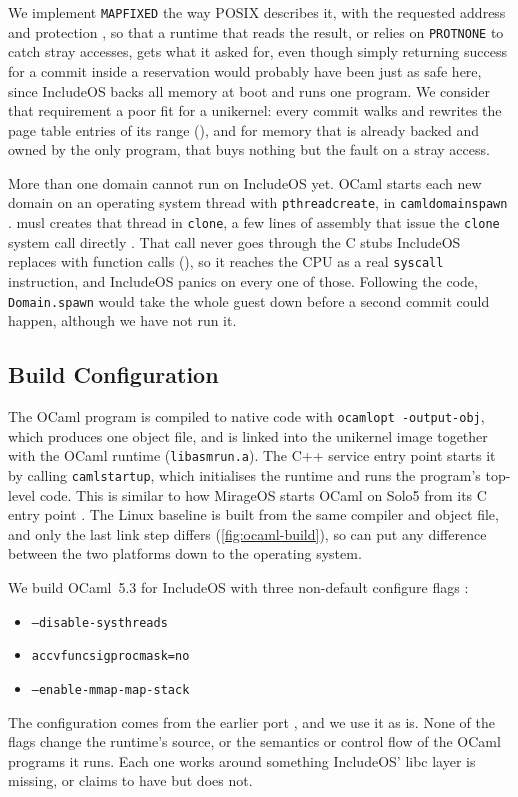 \documentclass[12pt]{report}
\newcommand{\fullref}[1]{\Cref{#1}}
\renewcommand{\_}{\origunderscore\allowbreak}
\begin{document}
We implement \texttt{MAP\_FIXED} the way POSIX describes it, with the requested address and protection \cite{posix2024mmap}, so that a runtime that reads the result, or relies on \texttt{PROT\_NONE} to catch stray accesses, gets what it asked for, even though simply returning success for a commit inside a reservation would probably have been just as safe here, since IncludeOS backs all memory at boot and runs one program. We consider that requirement a poor fit for a unikernel: every commit walks and rewrites the page table entries of its range (\fullref{sec:mprotect-impl}), and for memory that is already backed and owned by the only program, that buys nothing but the fault on a stray access.

More than one domain cannot run on IncludeOS yet. OCaml starts each new domain on an operating system thread with \texttt{pthread\_create}, in \texttt{caml\_domain\_spawn} \cite{ocaml-domain-spawn}. musl creates that thread in \texttt{\_\_clone}, a few lines of assembly that issue the \texttt{clone} system call directly \cite{musl-clone-source}. That call never goes through the C stubs IncludeOS replaces with function calls (\fullref{sec:impl-musl}), so it reaches the CPU as a real \texttt{syscall} instruction, and IncludeOS panics on every one of those. Following the code, \texttt{Domain.spawn} would take the whole guest down before a second commit could happen, although we have not run it.

\subsection{Build Configuration}
\label{sec:design-ocaml-build}


The OCaml program is compiled to native code with \texttt{ocamlopt -output-obj}, which produces one object file, and is linked into the unikernel image together with the OCaml runtime (\texttt{libasmrun.a}). The C++ service entry point starts it by calling \texttt{caml\_startup}, which initialises the runtime and runs the program's top-level code. This is similar to how MirageOS starts OCaml on Solo5 from its C entry point \cite{mirage-solo5-main}. The Linux baseline is built from the same compiler and object file, and only the last link step differs (\cref{fig:ocaml-build}), so \fullref{sec:eval-ocaml} can put any difference between the two platforms down to the operating system.

We build OCaml~5.3 for IncludeOS with three non-default configure flags \cite{ocaml2025configure}:
\begin{itemize}
  \item \texttt{--disable-systhreads}
  \item \texttt{ac\_cv\_func\_sigprocmask=no}
  \item \texttt{--enable-mmap-map-stack}
\end{itemize}
The configuration comes from the earlier port \cite{skjegstad2025runtimes}, and we use it as is. None of the flags change the runtime's source, or the semantics or control flow of the OCaml programs it runs. Each one works around something IncludeOS' libc layer is missing, or claims to have but does not.
\end{document}
